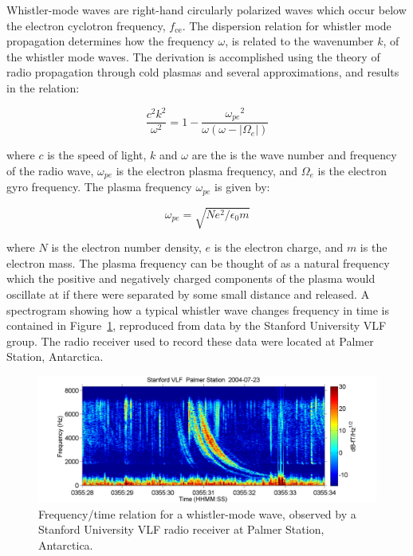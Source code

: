 Whistler-mode waves are right-hand circularly polarized waves which occur below the electron cyclotron frequency, $f_{\mbox{ce}}$. The dispersion relation for whistler mode propagation determines how the frequency $\omega$, is related to the wavenumber $k$, of the whistler mode waves. The derivation is accomplished using the theory of radio propagation through cold plasmas and several approximations, and results in the relation:

$$\frac{c^2k^2}{\omega^2} = 1 - \frac{{\omega_{pe}}^2}{\omega(\omega - |\Omega_e|)}$$

where $c$ is the speed of light, $k$ and $\omega$ are the is the wave number and frequency of the radio wave, $\omega_{pe}$ is the electron plasma frequency, and $\Omega_e$ is the electron gyro frequency. The plasma frequency $\omega_{pe}$ is given by:

$$\omega_{pe} = \sqrt{N e^2/\epsilon_0 m}$$

where $N$ is the electron number density, $e$ is the electron charge, and $m$ is the electron mass. The plasma frequency can be thought of as a natural frequency which the positive and negatively charged components of the plasma would oscillate at if there were separated by some small distance and released. A spectrogram showing how a typical whistler wave changes frequency in time is contained in Figure~\ref{whistler_spectrogram}, reproduced from data by the Stanford University VLF group. The radio receiver used to record these data were located at Palmer Station, Antarctica.

\begin{figure}[p]
\label{whistler_spectrogram}
\centering
\includegraphics[width=1.0\textwidth,angle=0]{figures/chapter_2/whistler/Whistler_radio_palmer_2004-07-23_T035528.png}
\caption{Frequency/time relation for a whistler-mode wave, observed by a Stanford University VLF radio receiver at Palmer Station, Antarctica.}
\end{figure}


